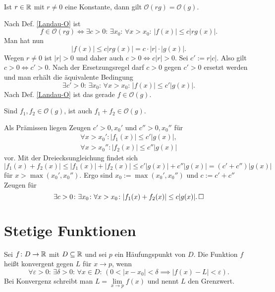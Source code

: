 \begin{Satz}
Ist $r\in\mathbb R$ mit $r\ne 0$ eine Konstante, dann gilt
$\mathcal O(rg)=\mathcal O(g)$.
\end{Satz}
\begin{Beweis}
Nach Def. \ref{Landau-O} ist
\[f\in\mathcal O(rg) \iff 
\exists c{>}0\colon\,\exists x_0\colon\,\forall x{>}x_0\colon\,|f(x)|\le c|rg(x)|.\]
Man hat nun
\[|f(x)|\le c|rg(x)| = c\cdot |r|\cdot |g(x)|.\]
Wegen $r\ne 0$ ist $|r|>0$ und daher auch $c>0\iff c|r|>0$. Sei
$c':=r|c|$. Also gilt $c>0\iff c'>0$. Nach der Ersetzungsregel
darf $c>0$ gegen $c'>0$ ersetzt werden und man erhält die
äquivalente Bedingung%
\[\exists c'{>}0\colon\,\exists x_0\colon\,
\forall x{>}x_0\colon\,|f(x)|\le c'|g(x)|.\]
Nach Def. \ref{Landau-O} ist das gerade $f\in\mathcal O(g)$.\;\qedsymbol
\end{Beweis}

\begin{Satz}
Sind $f_1,f_2\in\mathcal O(g)$, ist auch $f_1+f_2\in\mathcal O(g)$.
\end{Satz}
\begin{Beweis}
Als Prämissen liegen Zeugen $c'>0,x_0'$ und $c''>0,x_0''$ für%
\begin{gather*}
\forall x>x_0'\colon |f_1(x)|\le c'|g(x)|,\\
\forall x>x_0''\colon |f_2(x)|\le c''|g(x)|
\end{gather*}
vor. Mit der Dreiecksungleichung findet sich
\[|f_1(x)+f_2(x)|\le |f_1(x)|+|f_2(x)| \le c'|g(x)|+c''|g(x)| = (c'+c'')|g(x)|\]
für $x>\max(x_0',x_0'')$. Ergo sind $x_0:=\max(x_0',x_0'')$ und $c:=c'+c''$
Zeugen für%
\[\exists c>0\colon\exists x_0\colon\forall x>x_0\colon
  |f_1(x)+f_2(x)|\le c|g(x)|.\,\square\]
\end{Beweis}

\newpage
\section{Stetige Funktionen}

\begin{Definition}\label{fn-lim}
Sei $f\colon D\to\mathbb R$ mit $D\subseteq\mathbb R$ und sei $p$ ein
Häufungspunkt von $D$. Die Funktion $f$ heißt konvergent
gegen $L$ für $x\to p$, wenn%
\[\forall \varepsilon{>}0\colon\,\exists \delta{>}0\colon\,\forall x{\in}D\colon\,
(0<|x-x_0|<\delta\implies |f(x)-L|<\varepsilon).\]
Bei Konvergenz schreibt man $L=\lim\limits_{x\to p} f(x)$ und nennt $L$ den Grenzwert.
\end{Definition}

